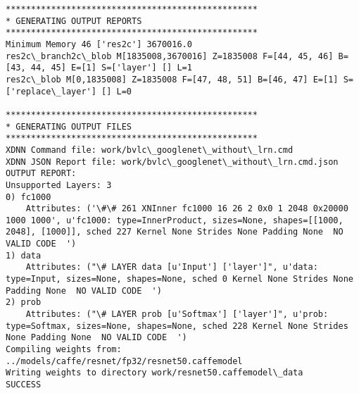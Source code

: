 \documentclass[11pt]{article}
\begin{document}
\begin{Verbatim}[commandchars=\\\{\}]
**************************************************
* GENERATING OUTPUT REPORTS
**************************************************
Minimum Memory 46 ['res2c'] 3670016.0
res2c\_branch2c\_blob M[1835008,3670016] Z=1835008 F=[44, 45, 46] B=[43, 44, 45] E=[1] S=['layer'] [] L=1
res2c\_blob M[0,1835008] Z=1835008 F=[47, 48, 51] B=[46, 47] E=[1] S=['replace\_layer'] [] L=0

**************************************************
* GENERATING OUTPUT FILES
**************************************************
XDNN Command file: work/bvlc\_googlenet\_without\_lrn.cmd
XDNN JSON Report file: work/bvlc\_googlenet\_without\_lrn.cmd.json
OUTPUT REPORT:
Unsupported Layers: 3
0) fc1000
	Attributes: ('\#\# 261 XNInner fc1000 16 26 2 0x0 1 2048 0x20000 1000 1000', u'fc1000: type=InnerProduct, sizes=None, shapes=[[1000, 2048], [1000]], sched 227 Kernel None Strides None Padding None  NO VALID CODE  ')
1) data
	Attributes: ("\# LAYER data [u'Input'] ['layer']", u'data: type=Input, sizes=None, shapes=None, sched 0 Kernel None Strides None Padding None  NO VALID CODE  ')
2) prob
	Attributes: ("\# LAYER prob [u'Softmax'] ['layer']", u'prob: type=Softmax, sizes=None, shapes=None, sched 228 Kernel None Strides None Padding None  NO VALID CODE  ')
Compiling weights from: ../models/caffe/resnet/fp32/resnet50.caffemodel
Writing weights to directory work/resnet50.caffemodel\_data
SUCCESS


\end{Verbatim}
\end{document}
